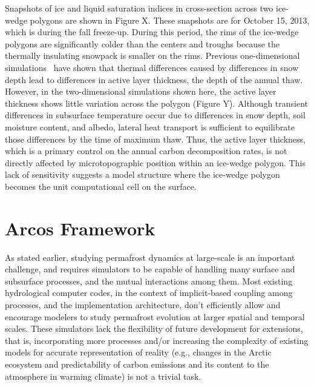 \documentclass[review]{elsarticle}
\begin{document}
Snapshots of ice and liquid saturation indices in cross-section across two ice-wedge polygons are shown in Figure X. These snapshots are for October 15, 2013, which is during the fall freeze-up. During this period, the rims of the ice-wedge polygons are significantly colder than the centers and troughs because the thermally insulating snowpack is smaller on the rims. Previous one-dimensional simulations~\cite{atchley2016} have shown that thermal differences caused by differences in snow depth lead to differences in active layer thickness, the depth of the annual thaw. However, in the two-dimensional simulations shown here, the active layer thickness shows little variation across the polygon (Figure Y). Although transient differences in subsurface temperature occur due to differences in snow depth, soil moisture content, and albedo, lateral heat transport is sufficient to equilibrate those differences by the time of maximum thaw. Thus, the active layer thickness, which is a primary control on the annual carbon decomposition rates, is not directly affected by microtopographic position within an ice-wedge polygon. This lack of sensitivity suggests a model structure where the ice-wedge polygon becomes the unit computational cell on the surface. 

\section{Arcos Framework}\label{arcos-framework}

As stated earlier, studying permafrost dynamics at large-scale is an important challenge, and requires simulators to be capable of handling many surface and subsurface processes, and the mutual interactions among them. Most existing hydrological computer codes, in the context of implicit-based coupling among processes, and the implementation architecture, don't efficiently allow and encourage modelers to study permafrost evolution at larger spatial and temporal scales. These simulators lack the flexibility of future development for extensions, that is, incorporating more processes and/or increasing the complexity of existing models for accurate representation of reality (e.g., changes in the Arctic ecosystem and predictability of carbon emissions and its content to the atmosphere in warming climate) is not a trivial task.
\end{document}
